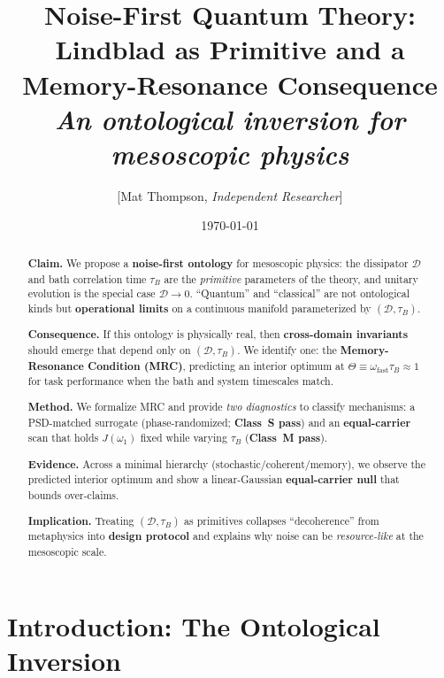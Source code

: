 \documentclass[11pt,letterpaper]{article}
\title{\bfseries\Large
Noise-First Quantum Theory: \\
Lindblad as Primitive and a Memory-Resonance Consequence\\[0.35em]
\itshape\normalsize
An ontological inversion for mesoscopic physics}
\author{[Mat Thompson, \emph{Independent Researcher}]}
\date{\today}
\begin{document}
\maketitle

\begin{abstract}
\textbf{Claim.} We propose a \textbf{noise-first ontology} for mesoscopic
physics: the dissipator $\mathcal{D}$ and bath correlation time $\tau_B$
are the \emph{primitive} parameters of the theory, and unitary evolution
is the special case $\mathcal{D}\to 0$. ``Quantum'' and ``classical'' are
not ontological kinds but \textbf{operational limits} on a continuous
manifold parameterized by $(\mathcal{D},\tau_B)$.

\textbf{Consequence.} If this ontology is physically real, then
\textbf{cross-domain invariants} should emerge that depend only on
$(\mathcal{D},\tau_B)$. We identify one: the \textbf{Memory-Resonance
Condition (MRC)}, predicting an interior optimum at
$\Theta\equiv\omega_{\mathrm{fast}}\tau_B\approx 1$ for task performance
when the bath and system timescales match.

\textbf{Method.} We formalize MRC and provide \emph{two diagnostics} to
classify mechanisms: a PSD-matched surrogate (phase-randomized;
\textbf{Class~S pass}) and an \textbf{equal-carrier} scan that holds
$J(\omega_1)$ fixed while varying $\tau_B$ (\textbf{Class~M pass}).

\textbf{Evidence.} Across a minimal hierarchy
(stochastic/coherent/memory), we observe the predicted interior optimum
and show a linear-Gaussian \textbf{equal-carrier null} that bounds
over-claims.

\textbf{Implication.} Treating $(\mathcal{D},\tau_B)$ as primitives
collapses ``decoherence'' from metaphysics into \textbf{design protocol}
and explains why noise can be \emph{resource-like} at the mesoscopic scale.
\end{abstract}

\section{Introduction: The Ontological Inversion}
\end{document}
